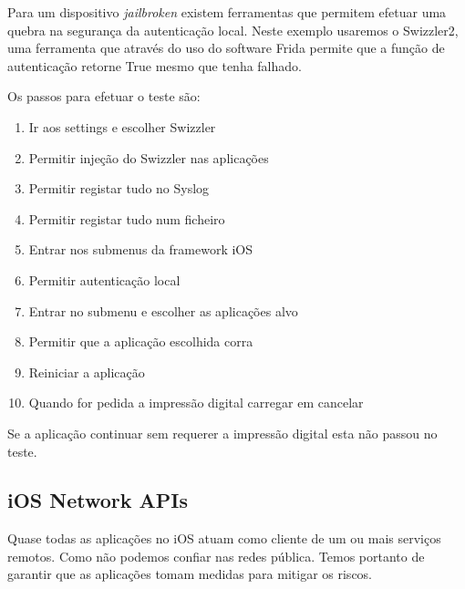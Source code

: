 Para um dispositivo \textit{jailbroken} existem ferramentas que permitem efetuar uma quebra na segurança da autenticação local. Neste exemplo usaremos o Swizzler2, uma ferramenta que através do uso do software Frida permite que a função de autenticação retorne True mesmo que tenha falhado.\par
\hfill\par
Os passos para efetuar o teste são:
\begin{enumerate}
\item Ir aos settings e escolher Swizzler
\item Permitir injeção do Swizzler nas aplicações
\item Permitir registar tudo no Syslog
\item Permitir registar tudo num ficheiro
\item Entrar nos submenus da framework iOS
\item Permitir autenticação local
\item Entrar no submenu e escolher as aplicações alvo
\item Permitir que a aplicação escolhida corra
\item Reiniciar a aplicação
\item Quando for pedida a impressão digital carregar em cancelar
\end{enumerate}

Se a aplicação continuar sem requerer a impressão digital esta não passou no teste.



\subsection{iOS Network APIs}
\hfill\par
Quase todas as aplicações no iOS atuam como cliente de um ou mais serviços remotos.  Como não podemos confiar nas redes pública. Temos portanto de garantir que as aplicações tomam medidas para mitigar os riscos. 


